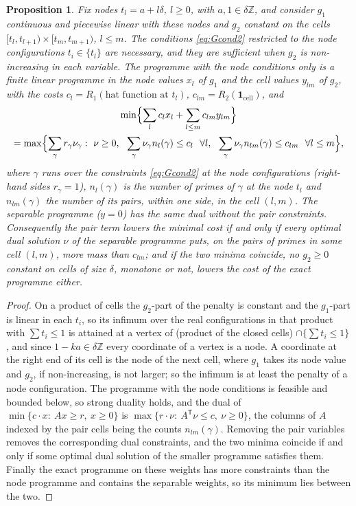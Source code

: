\documentclass[11pt]{amsart}
\newtheorem{proposition}[theorem]{Proposition}
\theoremstyle{remark}
\newcommand{\Z}{\mathbb{Z}}
\begin{document}
\begin{proposition}\label{prop:dual}
Fix nodes $t_l=a+l\delta$, $l\ge0$, with $a,1\in\delta\Z$, and consider $g_1$ continuous and piecewise linear with these nodes and $g_2$ constant on the cells $[t_l,t_{l+1})\times[t_m,t_{m+1})$, $l\le m$. The conditions \eqref{eq:Gcond2} restricted to the node configurations $t_i\in\{t_l\}$ are necessary, and they are sufficient when $g_2$ is non-increasing in each variable. The programme with the node conditions only is a finite linear programme in the node values $x_l$ of $g_1$ and the cell values $y_{lm}$ of $g_2$, with the costs $c_l=R_1(\text{hat function at }t_l)$, $c_{lm}=R_2(\mathbf 1_{\mathrm{cell}})$, and
\begin{multline*}
\min\Bigl\{\sum_lc_lx_l+\sum_{l\le m}c_{lm}y_{lm}\Bigr\}\\
=\max\Bigl\{\sum_\gamma r_\gamma\nu_\gamma:\ \nu\ge0,\ \ \sum_\gamma\nu_\gamma n_l(\gamma)\le c_l\ \ \forall l,\ \ \sum_\gamma\nu_\gamma n_{lm}(\gamma)\le c_{lm}\ \ \forall l\le m\Bigr\},
\end{multline*}
where $\gamma$ runs over the constraints \eqref{eq:Gcond2} at the node configurations (right-hand sides $r_\gamma=1$), $n_l(\gamma)$ is the number of primes of $\gamma$ at the node $t_l$ and $n_{lm}(\gamma)$ the number of its pairs, within one side, in the cell $(l,m)$. The separable programme ($y=0$) has the same dual without the pair constraints. Consequently the pair term lowers the minimal cost if and only if every optimal dual solution $\nu$ of the separable programme puts, on the pairs of primes in some cell $(l,m)$, more mass than $c_{lm}$; and if the two minima coincide, no $g_2\ge0$ constant on cells of size $\delta$, monotone or not, lowers the cost of the exact programme either.
\end{proposition}

\begin{proof}
On a product of cells the $g_2$-part of the penalty is constant and the $g_1$-part is linear in each $t_i$, so its infimum over the real configurations in that product with $\sum t_i\le1$ is attained at a vertex of (product of the closed cells) $\cap\{\sum t_i\le1\}$, and since $1-ka\in\delta\Z$ every coordinate of a vertex is a node. A coordinate at the right end of its cell is the node of the next cell, where $g_1$ takes its node value and $g_2$, if non-increasing, is not larger; so the infimum is at least the penalty of a node configuration. The programme with the node conditions is feasible and bounded below, so strong duality holds, and the dual of $\min\{c\cdot x:\ Ax\ge r,\ x\ge0\}$ is $\max\{r\cdot\nu:\ A^{\mathsf T}\nu\le c,\ \nu\ge0\}$, the columns of $A$ indexed by the pair cells being the counts $n_{lm}(\gamma)$. Removing the pair variables removes the corresponding dual constraints, and the two minima coincide if and only if some optimal dual solution of the smaller programme satisfies them. Finally the exact programme on these weights has more constraints than the node programme and contains the separable weights, so its minimum lies between the two.
\end{proof}
\end{document}
